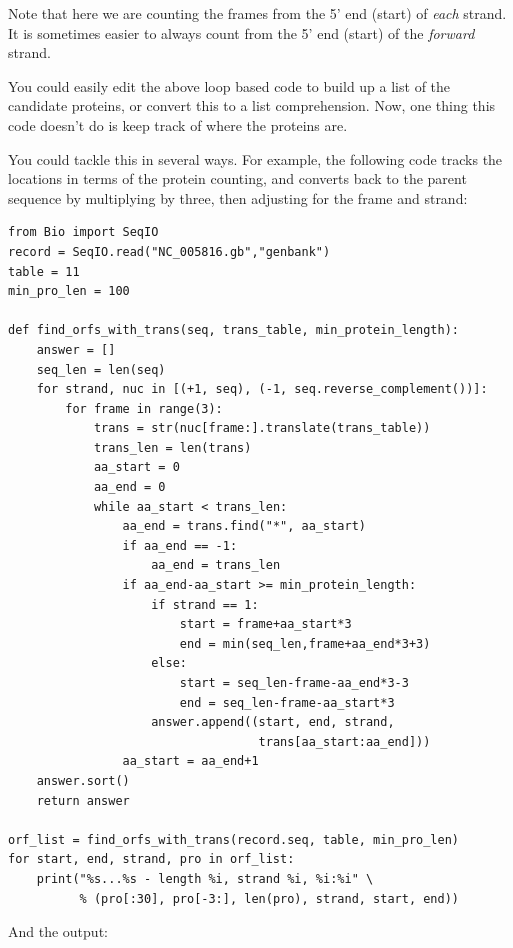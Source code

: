 \documentclass{report}
\begin{document}
Note that here we are counting the frames from the 5' end (start) of
\emph{each} strand. It is sometimes easier to always count from the 5' end
(start) of the \emph{forward} strand.

You could easily edit the above loop based code to build up a list of the
candidate proteins, or convert this to a list comprehension.  Now, one thing
this code doesn't do is keep track of where the proteins are.

You could tackle this in several ways.  For example, the following code tracks
the locations in terms of the protein counting, and converts back to the
parent sequence by multiplying by three, then adjusting for the frame and
strand:

\begin{verbatim}
from Bio import SeqIO 
record = SeqIO.read("NC_005816.gb","genbank")
table = 11
min_pro_len = 100

def find_orfs_with_trans(seq, trans_table, min_protein_length):
    answer = []
    seq_len = len(seq)
    for strand, nuc in [(+1, seq), (-1, seq.reverse_complement())]:
        for frame in range(3):
            trans = str(nuc[frame:].translate(trans_table))
            trans_len = len(trans)
            aa_start = 0
            aa_end = 0
            while aa_start < trans_len:
                aa_end = trans.find("*", aa_start)
                if aa_end == -1:
                    aa_end = trans_len
                if aa_end-aa_start >= min_protein_length:
                    if strand == 1:
                        start = frame+aa_start*3
                        end = min(seq_len,frame+aa_end*3+3)
                    else:
                        start = seq_len-frame-aa_end*3-3
                        end = seq_len-frame-aa_start*3                        
                    answer.append((start, end, strand,
                                   trans[aa_start:aa_end]))
                aa_start = aa_end+1
    answer.sort()
    return answer

orf_list = find_orfs_with_trans(record.seq, table, min_pro_len)
for start, end, strand, pro in orf_list:
    print("%s...%s - length %i, strand %i, %i:%i" \
          % (pro[:30], pro[-3:], len(pro), strand, start, end))
\end{verbatim}

\noindent And the output:
\end{document}
